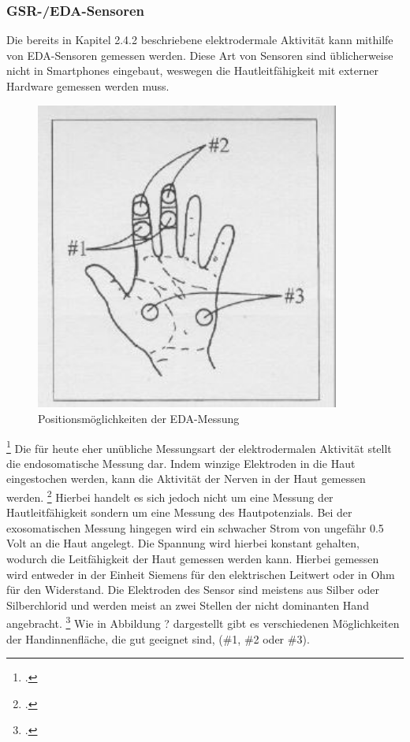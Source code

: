 \subsubsection{GSR-/EDA-Sensoren}
Die bereits in Kapitel 2.4.2 beschriebene elektrodermale Aktivität kann mithilfe von EDA-Sensoren gemessen werden. Diese Art von Sensoren sind üblicherweise nicht in Smartphones eingebaut, weswegen die Hautleitfähigkeit mit externer Hardware gemessen werden muss. \newline
\begin{figure}[h]
	\centering
	\includegraphics[width=10cm]{Bilder/gsr-hand.jpg}
	\caption[Positionsmöglichkeiten der EDA-Messung]{Positionsmöglichkeiten der EDA-Messung\footnotemark}
\end{figure}\footcitetext[][Folie 25]{Sch12}
\newline
Die für heute eher unübliche Messungsart der elektrodermalen Aktivität stellt die endosomatische Messung dar. Indem winzige Elektroden in die Haut eingestochen werden, kann die Aktivität der Nerven in der Haut gemessen werden. \footcite[Vgl.][Folie 25]{Sch12} Hierbei handelt es sich jedoch nicht um eine Messung der Hautleitfähigkeit sondern um eine Messung des Hautpotenzials. \newline
Bei der exosomatischen Messung hingegen wird ein schwacher Strom von ungefähr 0.5 Volt an die Haut angelegt. Die Spannung wird hierbei konstant gehalten, wodurch die Leitfähigkeit der Haut gemessen werden kann. Hierbei gemessen wird entweder in der Einheit Siemens für den elektrischen Leitwert oder in Ohm für den Widerstand. Die Elektroden des Sensor sind meistens aus Silber oder Silberchlorid und werden meist an zwei Stellen der nicht dominanten Hand angebracht. \footcite[Vgl.][Folie 25]{Sch12} Wie in Abbildung ? dargestellt gibt es verschiedenen Möglichkeiten der Handinnenfläche, die gut geeignet sind, (\#1, \#2 oder \#3). \newline
